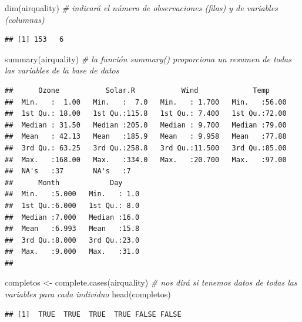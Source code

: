 \documentclass[
]{book}
\newenvironment{Shaded}{\begin{snugshade}}{\end{snugshade}}
\newcommand{\CommentTok}[1]{\textcolor[rgb]{0.56,0.35,0.01}{\textit{#1}}}
\newcommand{\FunctionTok}[1]{\textcolor[rgb]{0.00,0.00,0.00}{#1}}
\newcommand{\NormalTok}[1]{#1}
\newcommand{\OtherTok}[1]{\textcolor[rgb]{0.56,0.35,0.01}{#1}}
\begin{document}
\begin{Shaded}
\begin{Highlighting}[]
\FunctionTok{dim}\NormalTok{(airquality) }\CommentTok{\# indicará el número de observaciones (filas) y de variables (columnas)}
\end{Highlighting}
\end{Shaded}

\begin{verbatim}
## [1] 153   6
\end{verbatim}

\begin{Shaded}
\begin{Highlighting}[]
\FunctionTok{summary}\NormalTok{(airquality)  }\CommentTok{\# la función summary() proporciona un resumen de todas las variables de la base de datos}
\end{Highlighting}
\end{Shaded}

\begin{verbatim}
##      Ozone           Solar.R           Wind             Temp      
##  Min.   :  1.00   Min.   :  7.0   Min.   : 1.700   Min.   :56.00  
##  1st Qu.: 18.00   1st Qu.:115.8   1st Qu.: 7.400   1st Qu.:72.00  
##  Median : 31.50   Median :205.0   Median : 9.700   Median :79.00  
##  Mean   : 42.13   Mean   :185.9   Mean   : 9.958   Mean   :77.88  
##  3rd Qu.: 63.25   3rd Qu.:258.8   3rd Qu.:11.500   3rd Qu.:85.00  
##  Max.   :168.00   Max.   :334.0   Max.   :20.700   Max.   :97.00  
##  NA's   :37       NA's   :7                                       
##      Month            Day      
##  Min.   :5.000   Min.   : 1.0  
##  1st Qu.:6.000   1st Qu.: 8.0  
##  Median :7.000   Median :16.0  
##  Mean   :6.993   Mean   :15.8  
##  3rd Qu.:8.000   3rd Qu.:23.0  
##  Max.   :9.000   Max.   :31.0  
## 
\end{verbatim}

\begin{Shaded}
\begin{Highlighting}[]
\NormalTok{completos }\OtherTok{\textless{}{-}} \FunctionTok{complete.cases}\NormalTok{(airquality)  }\CommentTok{\# nos dirá si tenemos datos de todas las variables para cada individuo}
\FunctionTok{head}\NormalTok{(completos)}
\end{Highlighting}
\end{Shaded}

\begin{verbatim}
## [1]  TRUE  TRUE  TRUE  TRUE FALSE FALSE
\end{verbatim}
\end{document}

